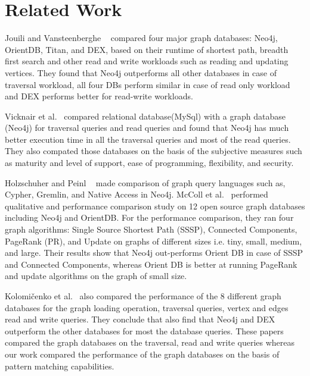 
\section{Related Work}

Jouili and Vansteenberghe ~\cite{jouili2013empirical} compared four major graph databases: Neo4j, OrientDB, Titan, and DEX, based on their runtime of shortest path, breadth first search and other read and write workloads such as reading and updating vertices. They found that Neo4j outperforms all other databases in case of traversal workload, all four DBs perform similar in case of read only workload and DEX performs better for read-write workloads.

Vicknair et al.~\cite{vicknair2010comparison} compared relational database(MySql) with a graph database (Neo4j) for traversal queries and read queries and found that Neo4j has much better execution time in all the traversal queries and most of the read queries. They also compated those databases on the basis of the subjective measures such as maturity and level of support, ease of programming, flexibility, and security.

Holzschuher and Peinl ~\cite{holzschuher2013performance} made comparison of graph query languages such as, Cypher, Gremlin, and Native Access in Neo4j.  
McColl et al.~\cite{mccoll2014performance} performed qualitative and performance comparison study on 12 open source graph databases including Neo4j and OrientDB. For the performance comparison, they ran four graph algorithms: Single Source Shortest Path (SSSP), Connected Components, PageRank (PR), and Update on graphs of different sizes i.e. tiny, small, medium, and large. Their results show that Neo4j out-performs Orient DB in case of SSSP and Connected Components, whereas Orient DB is better at running PageRank and update algorithms on the graph of small size.

Kolomičenko et al.~\cite{kolomivcenko2013experimental} also compared the performance of the 8 different graph databases for the graph loading operation, traversal queries, vertex and edges read and write queries. They conclude that also find that Neo4j and DEX outperform the other databases for most the database queries. These papers compared the graph databases on the traversal, read and write queries whereas our work compared the performance of the graph databases on the basis of pattern matching capabilities.


